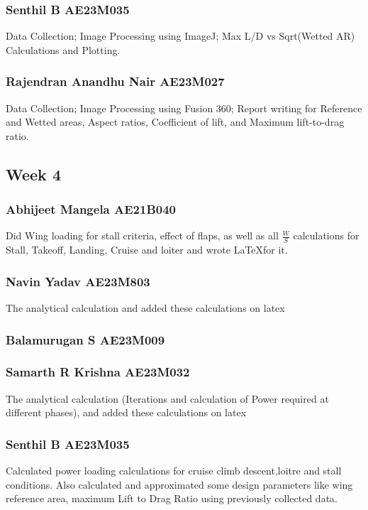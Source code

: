 \documentclass[12 pt]{article}
\begin{document}
\subsubsection{Senthil B AE23M035}
Data Collection; Image Processing using ImageJ; Max L/D vs Sqrt(Wetted AR) Calculations and Plotting.


\subsubsection{Rajendran Anandhu Nair AE23M027}
Data Collection; Image Processing using Fusion 360; Report writing for Reference and Wetted areas, Aspect ratios, Coefficient of lift, and Maximum lift-to-drag ratio. 

\subsection{Week 4}


\subsubsection{Abhijeet Mangela AE21B040}
Did Wing loading for stall criteria, effect of flaps, as well as all $\frac{W}{S}$ calculations for Stall, Takeoff, Landing, Cruise and loiter and wrote \LaTeX for it.

\subsubsection{Navin Yadav AE23M803}
The analytical calculation and added these calculations on latex 

\subsubsection{Balamurugan S AE23M009}


\subsubsection{Samarth R Krishna AE23M032}
The analytical calculation (Iterations and calculation of Power required at different phases), and added these calculations on latex


\subsubsection{Senthil B AE23M035}
Calculated power loading calculations for cruise climb descent,loitre and stall conditions. Also calculated and approximated some design parameters like wing reference area, maximum Lift to Drag Ratio using previously collected data.
\end{document}
